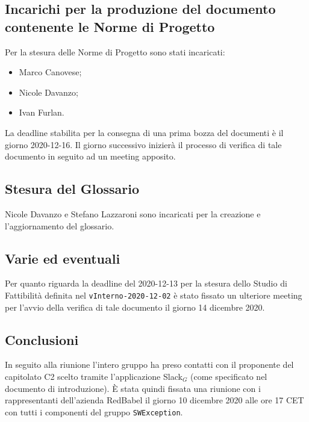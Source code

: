 	
	\subsection{Incarichi per la produzione del documento contenente le Norme di Progetto}
	Per la stesura delle Norme di Progetto sono stati incaricati:
	\begin{itemize}
		\item Marco Canovese;
		\item Nicole Davanzo;
		\item Ivan Furlan.
	\end{itemize}
	La deadline stabilita per la consegna di una prima bozza del documenti è il giorno 2020-12-16. Il giorno successivo inizierà il processo di verifica di tale documento in seguito ad un meeting apposito.

	\subsection{Stesura del Glossario}
	Nicole Davanzo e Stefano Lazzaroni sono incaricati per la creazione e l'aggiornamento del glossario.
	
	\subsection{Varie ed eventuali}
	Per quanto riguarda la deadline del 2020-12-13 per la stesura dello Studio di Fattibilità definita nel \verb|vInterno-2020-12-02| è stato fissato un ulteriore meeting per l'avvio della verifica di tale documento il giorno 14 dicembre 2020.
	
	\subsection{Conclusioni}
	In seguito alla riunione l'intero gruppo ha preso contatti con il proponente del capitolato C2 scelto tramite l'applicazione Slack$_G$ (come specificato nel documento di introduzione). È stata quindi fissata una riunione con i rappresentanti dell'azienda RedBabel il giorno 10 dicembre 2020 alle ore 17 CET con tutti i componenti del gruppo \verb|SWException|.
	